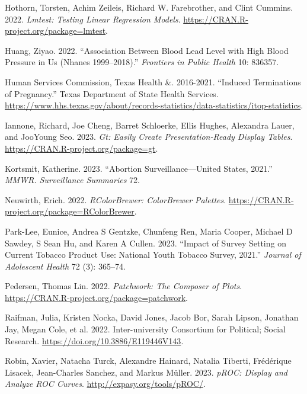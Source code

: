 \documentclass[
  letterpaper,
]{krantz}
\newlength{\cslhangindent}
\newenvironment{CSLReferences}[2] %
 {\begin{list}{}{%
  \setlength{\itemindent}{0pt}
  \setlength{\leftmargin}{0pt}
  \setlength{\parsep}{0pt}
  \ifodd #1
   \setlength{\leftmargin}{\cslhangindent}
   \setlength{\itemindent}{-1\cslhangindent}
  \fi
  \setlength{\itemsep}{#2\baselineskip}}}
 {\end{list}}
\begin{document}
\begin{CSLReferences}{1}{0}
Hothorn, Torsten, Achim Zeileis, Richard W. Farebrother, and Clint
Cummins. 2022. \emph{Lmtest: Testing Linear Regression Models}.
\url{https://CRAN.R-project.org/package=lmtest}.

Huang, Ziyao. 2022. {``Association Between Blood Lead Level with High
Blood Pressure in Us (Nhanes 1999--2018).''} \emph{Frontiers in Public
Health} 10: 836357.

Human Services Commission, Texas Health \&. 2016-2021. {``Induced
Terminations of Pregnancy.''} Texas Department of State Health Services.
\url{https://www.hhs.texas.gov/about/records-statistics/data-statistics/itop-statistics}.

Iannone, Richard, Joe Cheng, Barret Schloerke, Ellis Hughes, Alexandra
Lauer, and JooYoung Seo. 2023. \emph{Gt: Easily Create
Presentation-Ready Display Tables}.
\url{https://CRAN.R-project.org/package=gt}.

Kortsmit, Katherine. 2023. {``Abortion Surveillance---United States,
2021.''} \emph{MMWR. Surveillance Summaries} 72.

Neuwirth, Erich. 2022. \emph{RColorBrewer: ColorBrewer Palettes}.
\url{https://CRAN.R-project.org/package=RColorBrewer}.

Park-Lee, Eunice, Andrea S Gentzke, Chunfeng Ren, Maria Cooper, Michael
D Sawdey, S Sean Hu, and Karen A Cullen. 2023. {``Impact of Survey
Setting on Current Tobacco Product Use: National Youth Tobacco Survey,
2021.''} \emph{Journal of Adolescent Health} 72 (3): 365--74.

Pedersen, Thomas Lin. 2022. \emph{Patchwork: The Composer of Plots}.
\url{https://CRAN.R-project.org/package=patchwork}.

Raifman, Julia, Kristen Nocka, David Jones, Jacob Bor, Sarah Lipson,
Jonathan Jay, Megan Cole, et al. 2022. Inter-university Consortium for
Political; Social Research. \url{https://doi.org/10.3886/E119446V143}.

Robin, Xavier, Natacha Turck, Alexandre Hainard, Natalia Tiberti,
Frédérique Lisacek, Jean-Charles Sanchez, and Markus Müller. 2023.
\emph{pROC: Display and Analyze ROC Curves}.
\url{http://expasy.org/tools/pROC/}.


\end{CSLReferences}
\end{document}
